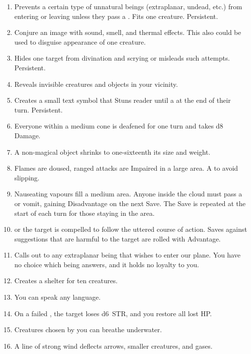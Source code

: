 \documentclass[itdr]{subfiles}
\begin{document}
\begin{enumerate}
	\vfill
	\break

	\item {} Prevents a certain type of unnatural beings (extraplanar, undead, etc.) from entering or leaving unless they pass a . Fits one creature. Persistent.
	\item {} Conjure an image with sound, smell, and thermal effects. This also could be used to disguise appearance of one creature.
	\item {} Hides one target from \mbox{divination} and scrying or misleads such attempts. \mbox{Persistent.}
	\item {} Reveals invisible creatures and objects in your vicinity.
	\item {} Creates a small text symbol that Stuns reader until a  at the end of their turn. Persistent.
	\item {} Everyone within a medium cone is deafened for one turn and takes d8 Damage.
	\item {} A non-magical object shrinks to one-sixteenth its size and weight.
	\item {} Flames are doused, ranged attacks are Impaired in a large area. A  to avoid slipping.
	\item {} Nauseating vapours fill a medium area. Anyone inside the cloud must pass a  or vomit, gaining Disadvantage on the next Save. The Save is repeated at the start of each turn for those staying in the area.
	\item {}  or the target is \mbox{compelled} to follow the uttered course of action. Saves against suggestions that are harmful to the target are rolled with Advantage.
	\item {} Calls out to any extraplanar being that wishes to enter our plane. You have no choice which being answers, and it holds no loyalty to you.
	\item {} Creates a shelter for ten creatures.
	\item {} You can speak any language.
	\item {} On a failed , the target loses d6~STR, and you restore all lost HP.
	\item {} Creatures chosen by you can breathe underwater.
	\item {} A line of strong wind deflects arrows, smaller creatures, and gases.
\end{enumerate}
\end{document}
